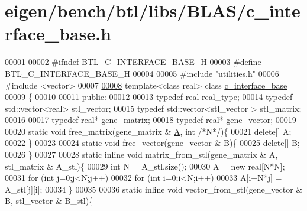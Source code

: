 \hypertarget{eigen_2bench_2btl_2libs_2_b_l_a_s_2c__interface__base_8h_source}{}\section{eigen/bench/btl/libs/\+B\+L\+A\+S/c\+\_\+interface\+\_\+base.h}
\label{eigen_2bench_2btl_2libs_2_b_l_a_s_2c__interface__base_8h_source}

\begin{DoxyCode}
00001 
00002 \textcolor{preprocessor}{#ifndef BTL\_C\_INTERFACE\_BASE\_H}
00003 \textcolor{preprocessor}{#define BTL\_C\_INTERFACE\_BASE\_H}
00004 
00005 \textcolor{preprocessor}{#include "utilities.h"}
00006 \textcolor{preprocessor}{#include <vector>}
00007 
\hyperlink{classc__interface__base}{00008} \textcolor{keyword}{template}<\textcolor{keyword}{class} real> \textcolor{keyword}{class }\hyperlink{classc__interface__base}{c\_interface\_base}
00009 \{
00010 
00011 \textcolor{keyword}{public}:
00012 
00013   \textcolor{keyword}{typedef} real                      real\_type;
00014   \textcolor{keyword}{typedef} std::vector<real>         stl\_vector;
00015   \textcolor{keyword}{typedef} std::vector<stl\_vector >  stl\_matrix;
00016 
00017   \textcolor{keyword}{typedef} real* gene\_matrix;
00018   \textcolor{keyword}{typedef} real* gene\_vector;
00019 
00020   \textcolor{keyword}{static} \textcolor{keywordtype}{void} free\_matrix(gene\_matrix & \hyperlink{group___core___module_class_eigen_1_1_matrix}{A}, \textcolor{keywordtype}{int} \textcolor{comment}{/*N*/})\{
00021     \textcolor{keyword}{delete}[] A;
00022   \}
00023 
00024   \textcolor{keyword}{static} \textcolor{keywordtype}{void} free\_vector(gene\_vector & \hyperlink{group___core___module_class_eigen_1_1_matrix}{B})\{
00025     \textcolor{keyword}{delete}[] B;
00026   \}
00027 
00028   \textcolor{keyword}{static} \textcolor{keyword}{inline} \textcolor{keywordtype}{void} matrix\_from\_stl(gene\_matrix & A, stl\_matrix & A\_stl)\{
00029     \textcolor{keywordtype}{int} N = A\_stl.size();
00030     A = \textcolor{keyword}{new} real[N*N];
00031     \textcolor{keywordflow}{for} (\textcolor{keywordtype}{int} j=0;j<N;j++)
00032       \textcolor{keywordflow}{for} (\textcolor{keywordtype}{int} i=0;i<N;i++)
00033         A[i+N*j] = A\_stl[j][i];
00034   \}
00035 
00036   \textcolor{keyword}{static} \textcolor{keyword}{inline} \textcolor{keywordtype}{void} vector\_from\_stl(gene\_vector & B, stl\_vector & B\_stl)\{

\end{DoxyCode}
